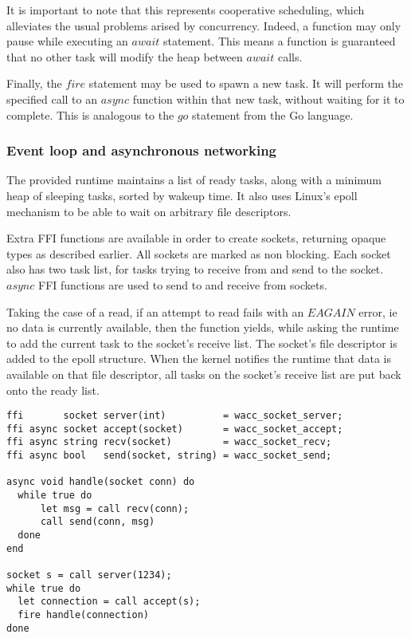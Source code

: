 \documentclass{article}
\begin{document}
It is important to note that this represents cooperative scheduling, which alleviates the usual problems arised by
concurrency. Indeed, a function may only pause while executing an $await$ statement. This means a function is guaranteed
that no other task will modify the heap between $await$ calls.

Finally, the $fire$ statement may be used to spawn a new task. It will perform the specified call to an $async$ function
within that new task, without waiting for it to complete. This is analogous to the $go$ statement from the Go language.

\subsubsection{Event loop and asynchronous networking}
The provided runtime maintains a list of ready tasks, along with a minimum heap of sleeping tasks, sorted by wakeup time.
It also uses Linux's epoll mechanism to be able to wait on arbitrary file descriptors.

Extra FFI functions are available in order to create sockets, returning opaque types as described earlier. All sockets
are marked as non blocking. Each socket also has two task list, for tasks trying to receive from and send to the socket.
$async$ FFI functions are used to send to and receive from sockets.

Taking the case of a read, if an attempt to read fails with an $EAGAIN$ error, ie no data is currently available, then
the function yields, while asking the runtime to add the current task to the socket's receive list. The socket's file
descriptor is added to the epoll structure. When the kernel notifies the runtime that data is available on that file
descriptor, all tasks on the socket's receive list are put back onto the ready list.

\begin{lstlisting}
ffi       socket server(int)          = wacc_socket_server;
ffi async socket accept(socket)       = wacc_socket_accept;
ffi async string recv(socket)         = wacc_socket_recv;
ffi async bool   send(socket, string) = wacc_socket_send;

async void handle(socket conn) do
  while true do
      let msg = call recv(conn);
      call send(conn, msg)
  done
end

socket s = call server(1234);
while true do
  let connection = call accept(s);
  fire handle(connection)
done
\end{lstlisting}
\end{document}
